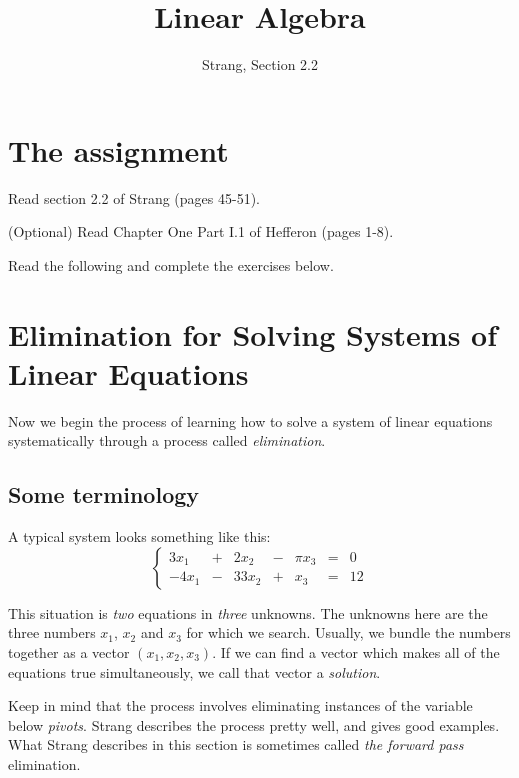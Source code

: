 \documentclass[11pt]{amsart}
\theoremstyle{definition}
\begin{document}
\title{Linear Algebra}
\author{Strang, Section 2.2}
\maketitle

\section{The assignment}
\begin{compactitem}
\item Read section 2.2 of Strang (pages 45-51).
\item (Optional) Read Chapter One Part I.1 of Hefferon (pages 1-8).
\item Read the following and complete the exercises below.
\end{compactitem}


\section{Elimination for Solving Systems of Linear Equations}

Now we begin the process of learning how to solve a system of linear equations systematically through a process called \emph{elimination}.

\subsection{Some terminology}

A typical system looks something like this:
\[
\left\{
\begin{array}{rrrrrrrr}
3 x_1 & +&  2 x_2 & - & \pi x_3 & = & 0 \\
-4 x_1 & -& 33 x_2 & + & x_3 & = & 12
\end{array}\right.
\]

This situation is \emph{two} equations in \emph{three} unknowns. The unknowns here are the three numbers $x_1$, $x_2$ and $x_3$ for which we search. Usually, we bundle the numbers together as a vector $(x_1, x_2, x_3)$. If we can find a vector which makes all of the equations true simultaneously, we call that vector a \emph{solution}.

Keep in mind that the process involves eliminating instances of the variable below \emph{pivots}. Strang describes the process pretty well, and gives good examples. What Strang describes in this section is sometimes called \emph{the forward pass} elimination.
\end{document}
